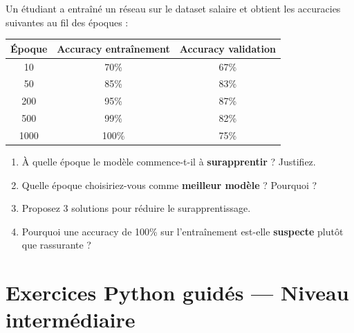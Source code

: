 
Un \'{e}tudiant a entra\^{i}n\'{e} un r\'{e}seau sur le dataset salaire et obtient les
accuracies suivantes au fil des \'{e}poques :

\begin{center}
\renewcommand{\arraystretch}{1.15}
\begin{tabular}{c|c|c}
    \toprule
    \textbf{\'{E}poque} & \textbf{Accuracy entra\^{i}nement} & \textbf{Accuracy validation} \\
    \midrule
    10   & 70\% & 67\% \\
    50   & 85\% & 83\% \\
    200  & 95\% & 87\% \\
    500  & 99\% & 82\% \\
    1000 & 100\% & 75\% \\
    \bottomrule
\end{tabular}
\end{center}

\begin{enumerate}[label=\alph*)]
    \item \`{A} quelle \'{e}poque le mod\`{e}le commence-t-il \`{a} \textbf{surapprentir} ?
        Justifiez.
    \item Quelle \'{e}poque choisiriez-vous comme \textbf{meilleur mod\`{e}le} ? Pourquoi ?
    \item Proposez 3 solutions pour r\'{e}duire le surapprentissage.
    \item Pourquoi une accuracy de 100\% sur l'entra\^{i}nement est-elle
        \textbf{suspecte} plut\^{o}t que rassurante ?
\end{enumerate}

\section*{Exercices Python guid\'{e}s --- Niveau interm\'{e}diaire}


